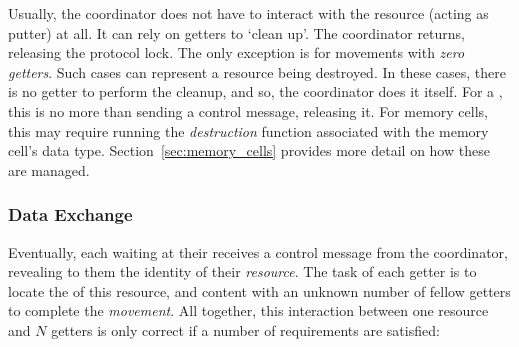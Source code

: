 \begin{enumerate}
	 Usually, the coordinator does not have to interact with the resource (acting as putter) at all. It can rely on getters to `clean up'. The coordinator returns, releasing the protocol lock. The only exception is for movements with \textit{zero getters}. Such cases can represent a resource being destroyed. In these cases, there is no getter to perform the cleanup, and so, the coordinator does it itself. For a , this is no more than sending a control message, releasing it. For memory cells, this may require running the \textit{destruction} function associated with the memory cell's data type.  Section~\ref{sec:memory_cells} provides more detail on how these are managed.
	 	
\end{enumerate}

\subsubsection{Data Exchange}
\label{sec:data_exchange}

Eventually, each  waiting at their  receives a control message from the coordinator, revealing to them the identity of their \textit{resource}. The task of each getter is to locate the  of this resource, and content with an unknown number of fellow getters to complete the \textit{movement}. All together, this interaction between one resource and $N$ getters is only correct if a number of requirements are satisfied:


